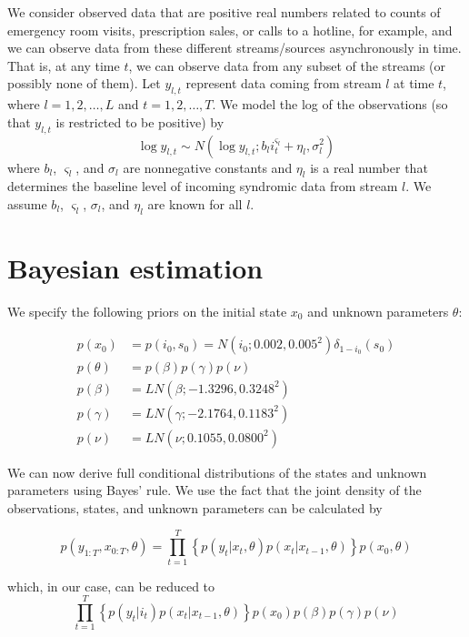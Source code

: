 \documentclass{article}
\begin{document}
We consider observed data that are positive real numbers related to counts of emergency room visits, prescription sales, or calls to a hotline, for example, and we can observe data from these different streams/sources asynchronously in time. That is, at any time $t$, we can observe data from any subset of the streams (or possibly none of them). Let $y_{l,t}$ represent data coming from stream $l$ at time $t$, where $l = 1,2,\ldots,L$ and $t = 1,2,\ldots,T$. We model the log of the observations (so that $y_{l,t}$ is restricted to be positive) by
\begin{equation}
\log y_{l,t} \sim N\left(\log y_{l,t};b_li_t^{\varsigma_l} + \eta_l,\sigma_l^2\right) \label{eqn:obs}
\end{equation}
where $b_l$, $\varsigma_l$, and $\sigma_l$ are nonnegative constants and $\eta_l$ is a real number that determines the baseline level of incoming syndromic data from stream $l$. We assume $b_l$, $\varsigma_l$, $\sigma_l$, and $\eta_l$ are known for all $l$.

\section{Bayesian estimation}

We specify the following priors on the initial state $x_0$ and unknown parameters $\theta$:

\begin{align*}
p(x_0) &= p(i_0,s_0) = N(i_0;0.002,0.005^2)\delta_{1 - i_0}(s_0) \\
p(\theta) &= p(\beta)p(\gamma)p(\nu) \\
p(\beta) &= LN(\beta;-1.3296,0.3248^2) \\
p(\gamma) &= LN(\gamma;-2.1764,0.1183^2) \\
p(\nu) &= LN(\nu;0.1055,0.0800^2)
\end{align*}

We can now derive full conditional distributions of the states and unknown parameters using Bayes' rule. We use the fact that the joint density of the observations, states, and unknown parameters can be calculated by

\begin{equation}
p(y_{1:T},x_{0:T},\theta) = \prod_{t = 1}^T \left\{p(y_t|x_t,\theta)p(x_t|x_{t-1},\theta)\right\}p(x_0,\theta) \label{eqn:joint}
\end{equation}

\noindent which, in our case, can be reduced to
\[\prod_{t = 1}^T \left\{p(y_t|i_t)p(x_t|x_{t-1},\theta)\right\}p(x_0)p(\beta)p(\gamma)p(\nu)\]
\end{document}
